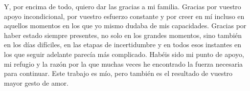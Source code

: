 Y, por encima de todo, quiero dar las gracias a mi familia. Gracias por vuestro apoyo incondicional, por vuestro esfuerzo constante y por creer en mí incluso en aquellos momentos en los que yo mismo dudaba de mis capacidades. Gracias por haber estado siempre presentes, no solo en los grandes momentos, sino también en los días difíciles, en las etapas de incertidumbre y en todos esos instantes en los que seguir adelante parecía más complicado. Habéis sido mi punto de apoyo, mi refugio y la razón por la que muchas veces he encontrado la fuerza necesaria para continuar. Este trabajo es mío, pero también es el resultado de vuestro mayor gesto de amor.